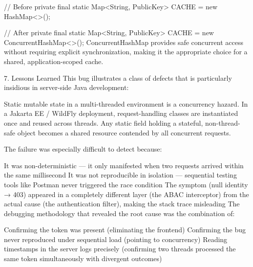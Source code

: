 // Before
private final static Map<String, PublicKey> CACHE = new HashMap<>();

// After
private final static Map<String, PublicKey> CACHE = new ConcurrentHashMap<>();
ConcurrentHashMap provides safe concurrent access without requiring explicit synchronization, making it the appropriate choice for a shared, application-scoped cache.

7. Lessons Learned
This bug illustrates a class of defects that is particularly insidious in server-side Java development:

Static mutable state in a multi-threaded environment is a concurrency hazard. In a Jakarta EE / WildFly deployment, request-handling classes are instantiated once and reused across threads. Any static field holding a stateful, non-thread-safe object becomes a shared resource contended by all concurrent requests.

The failure was especially difficult to detect because:

It was non-deterministic — it only manifested when two requests arrived within the same millisecond
It was not reproducible in isolation — sequential testing tools like Postman never triggered the race condition
The symptom (null identity → 403) appeared in a completely different layer (the ABAC interceptor) from the actual cause (the authentication filter), making the stack trace misleading
The debugging methodology that revealed the root cause was the combination of:

Confirming the token was present (eliminating the frontend)
Confirming the bug never reproduced under sequential load (pointing to concurrency)
Reading timestamps in the server logs precisely (confirming two threads processed the same token simultaneously with divergent outcomes)